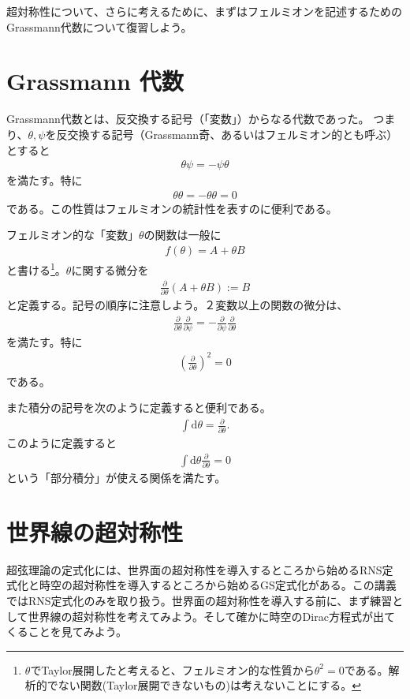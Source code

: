 \documentclass[report,paper=a4, fontsize=12pt, line_length=16cm, number_of_lines=33,dvipdfmx]{jlreq}
\numberwithin{equation}{chapter}
\numberwithin{equation}{section}
\newcommand{\del}{\partial}
\newcommand{\deldel}[2]{\frac{\del {#1}}{\del {#2}}}
\newcommand{\di}{\mathrm{d}}
\begin{document}
超対称性について、さらに考えるために、まずはフェルミオンを記述するためのGrassmann代数について復習しよう。
\section{Grassmann 代数}
Grassmann代数とは、反交換する記号（「変数」）からなる代数であった。
つまり、$\theta,\psi$を反交換する記号（Grassmann奇、あるいはフェルミオン的とも呼ぶ）
とすると
\begin{align}
\theta\psi=-\psi\theta
\end{align}
を満たす。特に
\begin{align}
\theta\theta = -\theta\theta =0
\end{align}
である。この性質はフェルミオンの統計性を表すのに便利である。

フェルミオン的な「変数」$\theta$の関数は一般に
\begin{align}
f(\theta)=A+\theta B
\end{align}
と書ける\footnote{$\theta$でTaylor展開したと考えると、フェルミオン的な性質から$\theta^2=0$である。解析的でない関数(Taylor展開できないもの)は考えないことにする。}。$\theta$に関する微分を
\begin{align}
\deldel{}{\theta} (A+\theta B):=B
\end{align}
と定義する。記号の順序に注意しよう。２変数以上の関数の微分は、
\begin{align}
\deldel{}{\theta}\deldel{}{\psi}
=
-\deldel{}{\psi}\deldel{}{\theta}
\end{align}
を満たす。特に
\begin{align}
\left(\deldel{}{\theta}\right)^2=0
\end{align}
である。

また積分の記号を次のように定義すると便利である。
\begin{align}
\int \di \theta =\deldel{}{\theta}.
\end{align}
このように定義すると
\begin{align}
\int \di \theta\deldel{}{\theta}=0
\end{align}
という「部分積分」が使える関係を満たす。

\section{世界線の超対称性}
超弦理論の定式化には、世界面の超対称性を導入するところから始めるRNS定式化と時空の超対称性を導入するところから始めるGS定式化がある。この講義ではRNS定式化のみを取り扱う。世界面の超対称性を導入する前に、まず練習として世界線の超対称性を考えてみよう。そして確かに時空のDirac方程式が出てくることを見てみよう。
\end{document}
